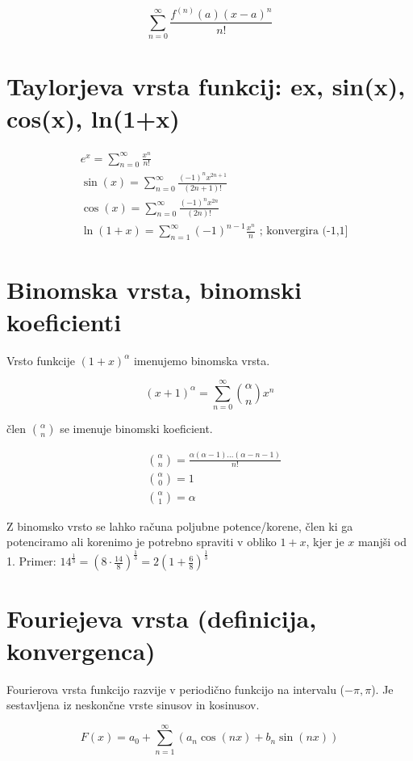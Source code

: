 \documentclass[12pt]{report}
\begin{document}
\[
\sum_{n=0}^{\infty} \frac{f^{(n)} (a)(x-a)^n}{n!}
\]

\section*{Taylorjeva vrsta funkcij: ex, sin(x), cos(x), ln(1+x)}

\begin{align*}
    & e^x=\sum_{n=0}^\infty \frac{x^{n}}{n!}\\
    & \sin(x)=\sum_{n=0}^\infty \frac{(-1)^nx^{2n+1}}{(2n+1)!}\\
    & \cos(x)=\sum_{n=0}^\infty \frac{(-1)^nx^{2n}}{(2n)!}\\
    & \ln(1+x)=\sum_{n=1}^\infty (-1)^{n-1} \frac{x^{n}}{n} \text{ ; konvergira (-1,1]}
\end{align*}

\section*{Binomska vrsta, binomski koeficienti}

Vrsto funkcije $(1+x)^\alpha$ imenujemo binomska vrsta.

\[(x + 1)^\alpha = \sum_{n = 0}^{\infty} \binom{\alpha}{n}x^n \]

člen $\binom{\alpha}{n}$ se imenuje binomski koeficient.

\begin{align*}
&\binom{\alpha}{n} = \frac{\alpha(\alpha - 1) ... (\alpha -n -1)}{n!}\\
&\binom{\alpha}{0} = 1 \\
&\binom{\alpha}{1} = \alpha
\end{align*}

Z binomsko vrsto se lahko računa poljubne potence/korene, člen ki ga potenciramo ali korenimo je potrebno spraviti v obliko $1+x$, kjer je $x$ manjši od 1.
\bigbreak
Primer: $14^{\frac{1}{3}}= (8\cdot \frac{14}{8})^{\frac{1}{3}}= 2(1+\frac{6}{8})^{\frac{1}{3}}$



\section*{Fouriejeva vrsta (definicija, konvergenca)}

Fourierova vrsta funkcijo razvije v periodično funkcijo na intervalu ($-\pi, \pi$). Je sestavljena iz neskončne vrste sinusov in kosinusov.

\[F(x)=a_0 + \sum_{n=1}^\infty ( a_n\cos(nx) + b_n\sin(nx))\]
\end{document}
